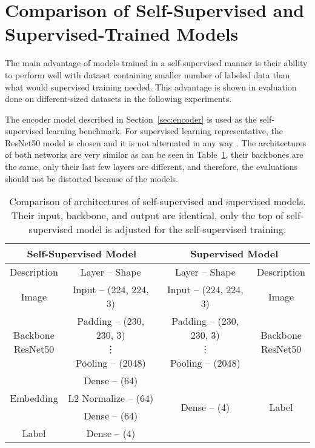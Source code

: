 \section{\label{sec:comparison}Comparison of Self-Supervised and Supervised-Trained Models}

The main advantage of models trained in a self-supervised manner is their ability to perform well with dataset containing smaller number of labeled data than what would supervised training needed. This advantage is shown in evaluation done on different-sized datasets in the following experiments.

The encoder model described in Section~\ref{sec:encoder} is used as the self-supervised learning benchmark. For supervised learning representative, the ResNet50 model is chosen and it is not alternated in any way \cite{he2015deep}. The architectures of both networks are very similar as can be seen in Table~\ref{tab:self-supervised-vs-supervised}, their backbones are the same, only their last few layers are different, and therefore, the evaluations should not be distorted because of the models.

\begin{table}[!ht]
    \begin{center}
        \begin{tabular}{ |c|c||c|c| }
            \hline
                \multicolumn{2}{|c||}{Self-Supervised Model} & \multicolumn{2}{c|}{Supervised Model} \\
            \hline
            \hline
            Description & Layer -- Shape & Layer -- Shape & Description \\
            \hline
            \hline
                Image & Input -- (224, 224, 3) & Input -- (224, 224, 3) & Image \\
            \hline
                \makecell{Backbone \\ ResNet50} & \makecell{Padding -- (230, 230, 3) \\ \vdots \\ Pooling -- (2048)} & \makecell{Padding -- (230, 230, 3) \\ \vdots \\ Pooling -- (2048)} & \makecell{Backbone \\ ResNet50} \\
            \hline
                & Dense -- (64) & \multirow{4}{*}{Dense -- (4)} & \multirow{4}{*}{Label} \\
            \cline{1-2}
                Embedding & L2 Normalize -- (64) & & \\
            \cline{1-2}
                & Dense -- (64) & & \\
            \cline{1-2}
                Label & Dense -- (4) & & \\
            \hline
        \end{tabular}
    \end{center}
    \caption{Comparison of architectures of self-supervised and supervised models. Their input, backbone, and output are identical, only the top of self-supervised model is adjusted for the self-supervised training.}
    \label{tab:self-supervised-vs-supervised}
\end{table}

